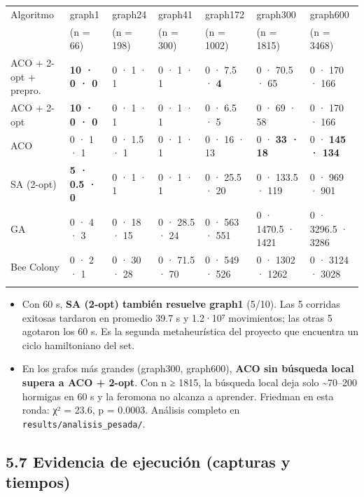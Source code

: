 \documentclass[
  spanish,
  11pt,
]{article}
\newcounter{none} %
\providecommand{\tightlist}{%
  \setlength{\itemsep}{0pt}\setlength{\parskip}{0pt}}
\begin{document}
{\def\LTcaptype{none} %
\footnotesize\setlength{\tabcolsep}{3pt}
\begin{center}
\begin{tabular}{@{}>{\raggedright\arraybackslash}p{1.75cm}llllll@{}}
\toprule\noalign{}
Algoritmo & graph1 & graph24 & graph41 & graph172 & graph300 & graph600 \\
 & (n = 66) & (n = 198) & (n = 300) & (n = 1002) & (n = 1815) & (n = 3468) \\
\midrule\noalign{}
ACO + 2-opt + prepro. & \textbf{10 · 0 · 0} & 0 · 1 · 1 & 0 · 1
· 1 & 0 · 7.5 · \textbf{4} & 0 · 70.5 · 65 & 0 · 170 · 166 \\
ACO + 2-opt & \textbf{10 · 0 · 0} & 0 · 1 · 1 & 0 · 1 · 1 &
0 · 6.5 · 5 & 0 · 69 · 58 & 0 · 170 · 166 \\
ACO & 0 · 1 · 1 & 0 · 1.5 · 1 & 0 · 1 · 1 & 0 · 16 · 13 &
0 · \textbf{33 · 18} & 0 · \textbf{145 · 134} \\
SA (2-opt) & \textbf{5 · 0.5 · 0} & 0 · 1 · 1 & 0 · 1 · 1 &
0 · 25.5 · 20 & 0 · 133.5 · 119 & 0 · 969 · 901 \\
GA & 0 · 4 · 3 & 0 · 18 · 15 & 0 · 28.5 · 24 & 0 · 563 · 551
& 0 · 1470.5 · 1421 & 0 · 3296.5 · 3286 \\
Bee Colony & 0 · 2 · 1 & 0 · 30 · 28 & 0 · 71.5 · 70 & 0 ·
549 · 526 & 0 · 1302 · 1262 & 0 · 3124 · 3028 \\
\bottomrule\noalign{}
\end{tabular}
\end{center}
}

\begin{itemize}
\tightlist
\item
  Con 60 s, \textbf{SA (2-opt) también resuelve graph1} (5/10). Las 5
  corridas exitosas tardaron en promedio 39.7 s y 1.2·10⁷ movimientos;
  las otras 5 agotaron los 60 s. Es la segunda metaheurística del
  proyecto que encuentra un ciclo hamiltoniano del set.
\item
  En los grafos más grandes (graph300, graph600), \textbf{ACO sin
  búsqueda local supera a ACO + 2-opt}. Con n ≥ 1815, la búsqueda local
  deja solo \textasciitilde70--200 hormigas en 60 s y la feromona no
  alcanza a aprender. Friedman en esta ronda: χ² = 23.6, p = 0.0003.
  Análisis completo en \texttt{results/analisis\_pesada/}.
\end{itemize}

\subsection{5.7 Evidencia de ejecución (capturas y
tiempos)}\label{evidencia-de-ejecuciuxf3n}
\end{document}
